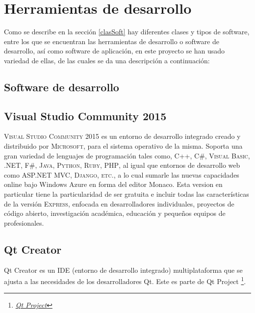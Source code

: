 \documentclass[12pt]{book} %
\begin{document}
\section{Herramientas de desarrollo}
	Como se describe en la sección \ref{clasSoft} hay diferentes clases y tipos de software, entre los que se encuentran las herramientas
	de 	desarrollo o software de desarrollo, así como software de aplicación, en este proyecto se han usado variedad de ellas, de las 
	cuales se da una descripción a continuación:
	\subsection*{Software de desarrollo}	
	\subsection{Visual Studio Community 2015 \label{VS}}
		\textsc{Visual Studio Community 2015} es un entorno de desarrollo integrado creado y distribuido por \textsc{Microsoft}, 
		para el sistema operativo de la misma.
		Soporta una gran variedad de lenguajes de programación tales como, \textsc{ C++, C\#, Visual Basic, .NET, F\#, Java, Python, 
		Ruby, PHP}, al igual que entornos de desarrollo web como \textsc{ASP.NET MVC, Django, etc.,} a lo cual sumarle las nuevas
		capacidades online bajo Windows Azure en forma del editor Monaco.
		Esta version en particular tiene la particularidad de ser gratuita e incluir todas las características de la versión 
		\textsc{Express}, enfocada en desarrolladores individuales, proyectos de código abierto, investigación académica, educación
		y pequeños equipos  de profesionales.
		
	\subsection{Qt Creator \label{qt}}
	Qt Creator es un IDE (entorno de desarrollo integrado) multiplataforma que se ajusta a las necesidades de los desarrolladores Qt. 
	Este es parte de Qt Project \footnote{\textit{\scriptsize \href{http://www.qt.io/}{Qt Project}}}.
	
\end{document}
